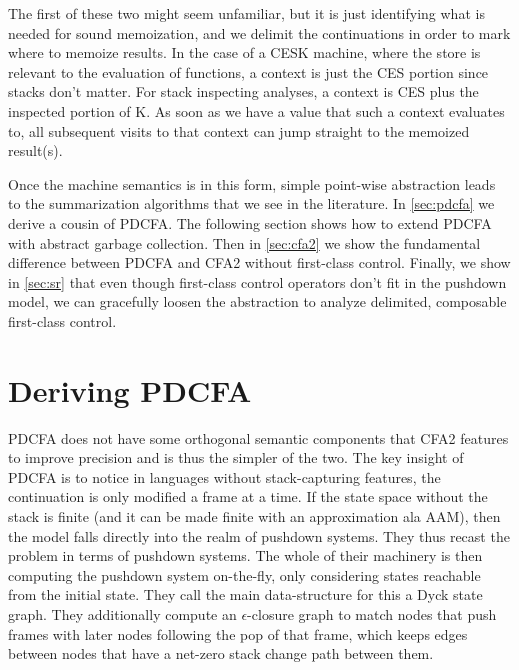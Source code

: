 The first of these two might seem unfamiliar, but it is just identifying what is needed for sound memoization, and we delimit the continuations in order to mark where to memoize results.
%
In the case of a CESK machine, where the store is relevant to the evaluation of functions, a context is just the CES portion since stacks don't matter.
%
For stack inspecting analyses, a context is CES plus the inspected portion of K.
%
As soon as we have a value that such a context evaluates to, all subsequent visits to that context can jump straight to the memoized result(s).

Once the machine semantics is in this form, simple point-wise abstraction leads to the summarization algorithms that we see in the literature.
%
In \autoref{sec:pdcfa} we derive a cousin of PDCFA.
%
The following section shows how to extend PDCFA with abstract garbage collection. %
%
Then in \autoref{sec:cfa2} we show the fundamental difference between PDCFA and CFA2 without first-class control. %
%
%
Finally, we show in \autoref{sec:sr} that even though first-class control operators don't fit in the pushdown model, we can gracefully loosen the abstraction to analyze delimited, composable first-class control.

\section{Deriving PDCFA}
\label{sec:pdcfa}

PDCFA does not have some orthogonal semantic components that CFA2 features to improve precision and is thus the simpler of the two.
%
The key insight of PDCFA is to notice in languages without stack-capturing features, the continuation is only modified a frame at a time.
%
If the state space without the stack is finite (and it can be made finite with an approximation ala AAM), then the model falls directly into the realm of pushdown systems.
%
They thus recast the problem in terms of pushdown systems.
%
The whole of their machinery is then computing the pushdown system on-the-fly, only considering states reachable from the initial state.
%
They call the main data-structure for this a Dyck state graph.
%
They additionally compute an $\epsilon$-closure graph to match nodes that push frames with later nodes following the pop of that frame, which keeps edges between nodes that have a net-zero stack change path between them.
%

